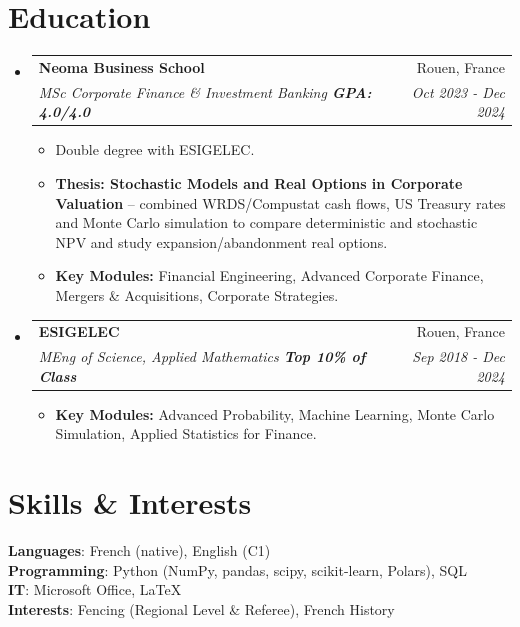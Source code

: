 \documentclass[a4paper,10pt]{article}
\makeatletter
\newcommand{\resumeItem}[1]{%
  \item{\normalsize #1\par}\vspace{-1pt}%
}
\newcommand{\resumeSubheading}[4]{
  \vspace{-1pt}\item
    \begin{tabular*}{0.97\textwidth}[t]{l@{\extracolsep{\fill}}r}
      \textbf{#1} & #2 \\[-2pt]
      \textit{#3} & \textit{#4} \\
    \end{tabular*}\vspace{-1pt}
}
\newcommand{\resumeSubHeadingListStart}{\begin{itemize}[leftmargin=0.12in, label={}, itemsep=2pt]}
\newcommand{\resumeSubHeadingListEnd}{\end{itemize}}
\newcommand{\resumeItemListStart}{\begin{itemize}[itemsep=2pt, parsep=0pt, topsep=2pt, partopsep=0pt, leftmargin=0.20in]}
\newcommand{\resumeItemListEnd}{\end{itemize}\vspace{-2pt}}
\makeatother
\begin{document}
\section{Education}
\resumeSubHeadingListStart

\resumeSubheading
{Neoma Business School}{Rouen, France}
{MSc Corporate Finance \& Investment Banking \textbar{} \textbf{GPA: 4.0/4.0}}{Oct 2023 - Dec 2024}
\resumeItemListStart
\resumeItem{Double degree with ESIGELEC.}
\resumeItem{\textbf{Thesis: Stochastic Models and Real Options in Corporate Valuation} -- combined WRDS/Compustat cash flows, US Treasury rates and Monte Carlo simulation to compare deterministic and stochastic NPV and study expansion/abandonment real options.}
\resumeItem{\textbf{Key Modules:} Financial Engineering, Advanced Corporate Finance, Mergers \& Acquisitions, Corporate Strategies.}
\resumeItemListEnd

\resumeSubheading
{ESIGELEC}{Rouen, France}
{MEng of Science, Applied Mathematics \textbar{} \textbf{Top 10\% of Class}}{Sep 2018 - Dec 2024}
\resumeItemListStart
\resumeItem{\textbf{Key Modules:} Advanced Probability, Machine Learning, Monte Carlo Simulation, Applied Statistics for Finance.}
\resumeItemListEnd

\resumeSubHeadingListEnd

\section{Skills \& Interests}
\begin{itemize}[leftmargin=0.20in, label={}]
\normalsize{\item{
\textbf{Languages}: French (native), English (C1) \\
\textbf{Programming}: Python (NumPy, pandas, scipy, scikit-learn, Polars), SQL \\
\textbf{IT}: Microsoft Office, \LaTeX \\
\textbf{Interests}: Fencing (Regional Level \& Referee), French History
}}
\end{itemize}
\end{document}
